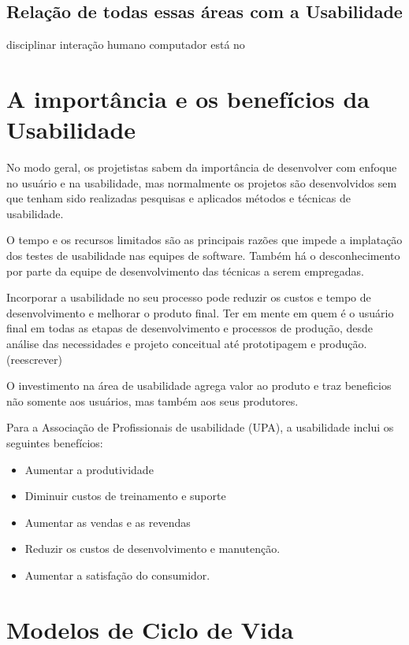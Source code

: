 \subsection{Relação de todas essas áreas com a Usabilidade}

	disciplinar interação humano computador está no 

\section{A importância e os benefícios da Usabilidade}

No modo geral, os projetistas sabem da importância de desenvolver com enfoque no usuário e na usabilidade, mas normalmente os projetos são desenvolvidos sem que tenham sido realizadas pesquisas e aplicados métodos e técnicas de usabilidade.
	
	O tempo e os recursos limitados são as principais razões que impede a implatação dos testes de usabilidade nas equipes de software. Também há o desconhecimento por parte da equipe de desenvolvimento das técnicas a serem empregadas.

Incorporar a usabilidade no seu processo pode reduzir os custos e tempo de desenvolvimento e melhorar o produto final. Ter em mente  em quem é o usuário final em todas as etapas de desenvolvimento e processos de produção, desde análise das necessidades e projeto conceitual até prototipagem e produção.  (reescrever)

	O investimento na área de usabilidade agrega valor ao produto e traz beneficios não somente aos usuários, mas também aos seus produtores. 

Para a Associação de Profissionais de usabilidade (UPA), a usabilidade inclui os seguintes benefícios:

\begin{itemize}
\item Aumentar a produtividade
\item Diminuir custos de treinamento e suporte
\item Aumentar as vendas e as revendas
\item Reduzir os custos de desenvolvimento e manutenção.
\item Aumentar a satisfação do consumidor.
\end{itemize}


\section{Modelos de Ciclo de Vida}


